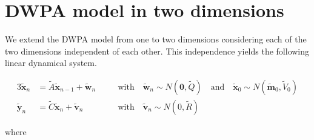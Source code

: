 \documentclass[fleqn,12pt]{article}
\begin{document}
\section{DWPA model in two dimensions}
\label{sec:dwpaModel2D}

We extend the DWPA model from one to two dimensions considering each of the two
dimensions independent of each other. This independence yields the following
linear dynamical system.

\begin{alignat}{3}
    \tilde{\mathbf{x}}_n &= \tilde{A}\tilde{\mathbf{x}}_{n-1} + \tilde{\mathbf{w}}_n && \quad \text{with} \quad\tilde{\mathbf{w}}_n\sim N(\mathbf{0}, \tilde{Q})\quad \text{and} \quad\tilde{\mathbf{x}}_0\sim N(\tilde{\mathbf{m}}_0, \tilde{V}_0)\label{eq:2D_DWPA_state}\\
    \tilde{\mathbf{y}}_n &= \tilde{C}\tilde{\mathbf{x}}_{n} + \tilde{\mathbf{v}}_n && \quad \text{with} \quad \tilde{\mathbf{v}}_n\sim N(0, \tilde{R})\label{eq:2D_DWPA_measurement}
\end{alignat}

\noindent where
\end{document}
